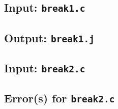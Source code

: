 \documentclass{article}
\begin{document}
\subsection{Input: {\tt break1.c}}



\subsection{Output: {\tt break1.j}}



\subsection{Input: {\tt break2.c}}



\subsection{Error(s) for {\tt break2.c}}


\end{document}
